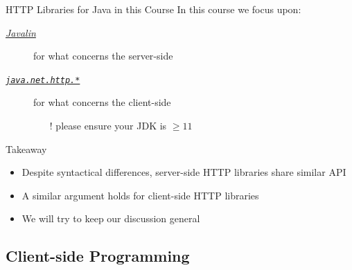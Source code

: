 \documentclass[presentation]{beamer}\mode<presentation>{\usetheme{AMSCesenaPurpleAndGold}}
\begin{document}
\begin{frame}{HTTP Libraries for Java in this Course}
    In this course we focus upon:
    \begin{description}
        \item[\href{https://javalin.io/}{\emph{Javalin}}] for what concerns the \alert{server}-side
        \item[\href{https://docs.oracle.com/en/java/javase/11/docs/api/java.net.http/java/net/http/package-summary.html}{\emph{\texttt{java.net.http.*}}}] for what concerns the \alert{client}-side 
        \begin{itemize}
            \item[!] please ensure your JDK is $\geq 11$
        \end{itemize} 
    \end{description}

    \vfill

    \begin{block}{Takeaway}
        \begin{itemize}
            \item Despite syntactical differences, server-side HTTP libraries share similar API
            \item A similar argument holds for client-side HTTP libraries
            \item We will try to keep our discussion general
        \end{itemize}
    \end{block}

\end{frame}

\subsection{Client-side Programming}
\end{document}
